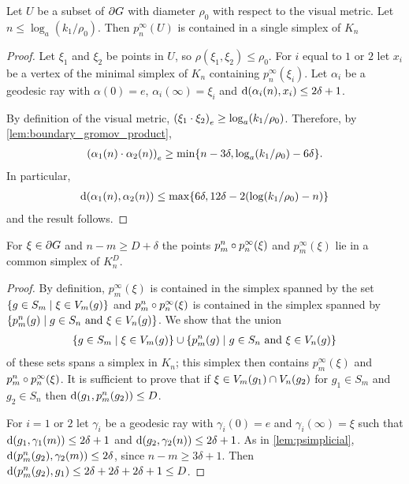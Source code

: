 \documentclass[a4paper]{article}
\begin{document}
\begin{lemma}\label{lem:projectstoasimplex}
  Let $U$ be a subset of $\boundary G$ with diameter $\rho_0$ with respect to
  the visual metric. Let $n \leq \log_a(k_1/\rho_0)$. Then $p^\infty_n(U)$ is
  contained in a single simplex of $K_n$
\end{lemma}

\begin{proof} 
  Let $\xi_1$ and $\xi_2$ be points in $U$, so $\rho(\xi_1, \xi_2)
  \leq \rho_0$.  For $i$ equal to $1$ or $2$ let $x_i$ be a vertex of the
  minimal simplex of $K_n$ containing $p^\infty_n(\xi_i)$. Let $\alpha_i$ be a
  geodesic ray with $\alpha(0) = e$, $\alpha_i(\infty) = \xi_i$ and
  $\dist(\alpha_i(n), x_i) \leq 2\delta+1$. 
  
  By definition of the visual metric, $\gromov{e}{\xi_1}{\xi_2} \geq
  \log_a(k_1/\rho_0)$. Therefore, by \cref{lem:boundary_gromov_product},
  \begin{align*}
    \gromov{e}{\alpha_1(n)}{\alpha_2(n)} \geq \min\{n - 3\delta, \log_a(k_1/\rho_0) - 6\delta\}.
  \end{align*}
  In particular,
  \begin{align*}
    \dist(\alpha_1(n), \alpha_2(n)) \leq \max\{6\delta, 12\delta - 2(\log(k_1/\rho_0) - n)\}
  \end{align*}
  and the result follows.
\end{proof}

\begin{lemma}
  For $\xi \in \boundary G$ and $n - m \geq D + \delta$ the points $p^n_m
  \composed p^\infty_n (\xi)$ and $p^\infty_m(\xi)$ lie in a common simplex of
  $K_n^D$.
\end{lemma}

\begin{proof}
  By definition, $p^\infty_m(\xi)$ is contained in the simplex spanned by the set
  $\set{g \in S_m \suchthat \xi \in V_m(g)}$ and $p^n_m\composed p^\infty_n(\xi)$ is
  contained in the simplex spanned by $\{p^n_m(g) \suchthat g \in S_n \text{
  and } \xi \in V_n(g)\}$.  We show that the union
  \begin{align*}
    \set{g \in S_m \suchthat \xi \in V_m(g)} \union \{p^n_m(g) \suchthat g \in S_n \text{ and } \xi \in V_n(g)\}
  \end{align*}
  of these sets spans a simplex in $K_n$; this simplex then contains
  $p^\infty_m(\xi)$ and $p^n_m\composed p^\infty_n(\xi)$.  It is sufficient to
  prove that if $\xi \in V_m(g_1) \intersection V_n(g_2)$ for $g_1 \in S_m$ and
  $g_2 \in S_n$ then $\dist(g_1, p^n_m(g_2)) \leq D$.

  For $i = 1$ or $2$ let $\gamma_i$ be a geodesic ray with $\gamma_i(0) = e$ and
  $\gamma_i(\infty) = \xi$ such that $\dist(g_1, \gamma_1(m)) \leq 2\delta
  + 1$ and $\dist(g_2, \gamma_2(n)) \leq 2\delta+1$.  As in
  \cref{lem:psimplicial}, $\dist(p^n_m(g_2), \gamma_2(m)) \leq
  2\delta$, since $n-m \geq 3\delta+1$.  Then $\dist(p^n_m(g_2), g_1) \leq
  2\delta + 2\delta + 2\delta+1 \leq D$.
\end{proof}
\end{document}

